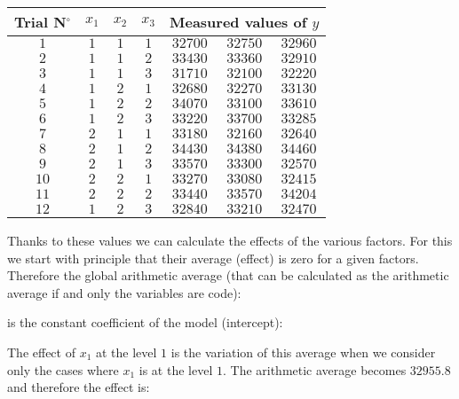 	\begin{table}[H]\centering
		\begin{center}
				\begin{tabular}{|c|c|c|c|c|c|c|}
					\hline
					\multicolumn{1}{c}{\cellcolor{black!30}\textbf{Trial N${}^\circ$}} & 
	  \multicolumn{1}{c}{\cellcolor{black!30}$x_1$} & 
	  \multicolumn{1}{c}{\cellcolor{black!30}$x_2$} & 
	  \multicolumn{1}{c}{\cellcolor{black!30}$x_3$} & 
	  \multicolumn{3}{c|}{\cellcolor{black!30}\textbf{Measured values of $y$}}                                             \\ \hline
		$1$ & $1$ & $1$ & $1$ & $32700$ & $32750$ & $32960$\\ \hline
		$2$ & $1$ & $1$ & $2$ & $33430$ & $33360$ & $32910$\\ \hline
		$3$ & $1$ & $1$ & $3$ & $31710$ & $32100$ & $32220$\\ \hline
		$4$ & $1$ & $2$ & $1$ & $32680$ & $32270$ & $33130$\\ \hline
		$5$ & $1$ & $2$ & $2$ & $34070$ & $33100$ & $33610$\\ \hline
		$6$ & $1$ & $2$ & $3$ & $33220$ & $33700$ & $33285$\\ \hline
		$7$ & $2$ & $1$ & $1$ & $33180$ & $32160$ & $32640$\\ \hline
		$8$ & $2$ & $1$ & $2$ & $34430$ & $34380$ & $34460$\\ \hline
		$9$ & $2$ & $1$ & $3$ & $33570$ & $33300$ & $32570$\\ \hline
		$10$ & $2$ & $2$ & $1$ & $33270$ & $33080$ & $32415$\\ \hline
		$11$ & $2$ & $2$ & $2$ & $33440$ & $33570$ & $34204$\\ \hline
		$12$ & $1$ & $2$ & $3$ & $32840$ & $33210$ & $32470$\\ \hline
	 		\end{tabular}
		\end{center}
	\end{table}

	Thanks to these values we can calculate the effects of the various factors. For this we start with principle that their average (effect) is zero for a given factors. Therefore the global arithmetic average (that can be calculated as the arithmetic average if and only the variables are code):
	
	is the constant coefficient of the model (intercept):
	
	The effect of $x_1$ at the level $1$ is the variation of this average when we consider only the cases where $x_1$ is at the level $1$. The arithmetic average becomes $32955.8$ and therefore the effect is:
	
